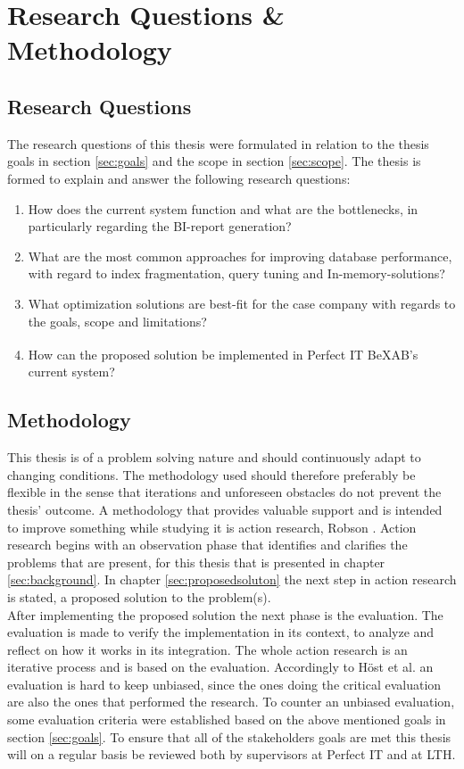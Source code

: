 \documentclass{cslthse-msc}
\newcommand{\bex}{BeX\textsuperscript{\textregistered}}
\begin{document}
\chapter{Research Questions \& Methodology}\label{chap:3}

\section{Research Questions}
The research questions of this thesis were formulated in relation to the thesis goals in section \ref{sec:goals} and the scope in section \ref{sec:scope}. The thesis is formed to explain and answer the following research questions:
\begin{enumerate}
\item	How does the current system function and what are the bottlenecks, in particularly regarding the BI-report generation?
\item 	What are the most common approaches for improving database performance, with regard to index fragmentation, query tuning and In-memory-solutions?
\item	What optimization solutions are best-fit for the case company with regards to the goals, scope and limitations?	
\item	How can the proposed solution be implemented in Perfect IT \bex AB's current system?
\end{enumerate}

\section{Methodology}
This thesis is of a problem solving nature and should continuously adapt to changing conditions. The methodology used should therefore preferably be flexible in the sense that iterations and unforeseen obstacles do not prevent the thesis' outcome. A methodology that provides valuable support and is intended to improve something while studying it is action research, Robson \cite{robson}. Action research begins with an observation phase that identifies and clarifies the problems that are present, for this thesis that is presented in chapter \ref{sec:background}. In chapter \ref{sec:proposedsoluton} the next step in action research is stated, a proposed solution to the problem(s).\\

\noindent After implementing the proposed solution the next phase is the evaluation. The evaluation is made to verify the implementation in its context, to analyze and reflect on how it works in its integration. The whole action research is an iterative process and is based on the evaluation. Accordingly to Höst et al.    \cite{regnell} an evaluation is hard to keep unbiased, since the ones doing the critical evaluation are also the ones that performed the research. To counter an unbiased evaluation, some evaluation criteria were established based on the above mentioned goals in section \ref{sec:goals}. To ensure that all of the stakeholders goals are met this thesis will on a regular basis be reviewed both by supervisors at Perfect IT and at LTH.
\end{document}
